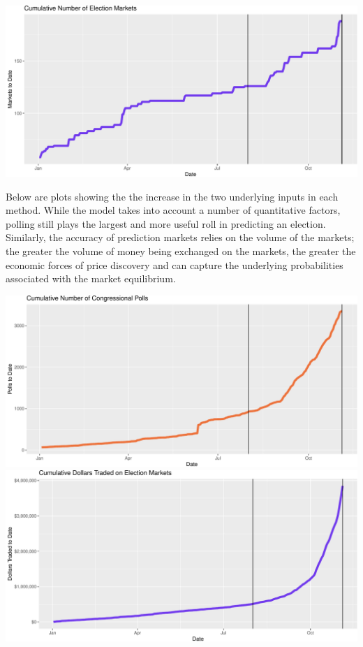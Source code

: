 \documentclass[]{article}
\begin{document}
\includegraphics{progress_report_files/figure-latex/plot_cum_markets-1.pdf}

Below are plots showing the the increase in the two underlying inputs in
each method. While the model takes into account a number of quantitative
factors, polling still plays the largest and more useful roll in
predicting an election. Similarly, the accuracy of prediction markets
relies on the volume of the markets; the greater the volume of money
being exchanged on the markets, the greater the economic forces of price
discovery and can capture the underlying probabilities associated with
the market equilibrium.

\includegraphics{progress_report_files/figure-latex/plot_cum_polls-1.pdf}
\includegraphics{progress_report_files/figure-latex/plot_cum_polls-2.pdf}
\end{document}
